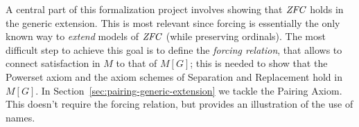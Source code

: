 A central part of this formalization project involves showing that
$\mathit{ZFC}$ holds in the generic extension. This is most relevant since
forcing is essentially the only known way to \emph{extend} models of
$\mathit{ZFC}$ (while preserving ordinals). The most difficult step to achieve
this goal is to define the \emph{forcing relation}, that allows to
connect satisfaction in $M$ to that of $M[G]$; this is needed to show
that the Powerset axiom and the axiom schemes of Separation and
Replacement hold in $M[G]$. In
Section~\ref{sec:pairing-generic-extension}
 we tackle the Pairing
Axiom. This doesn't require the forcing relation, but provides an
illustration of the use of names.
   

